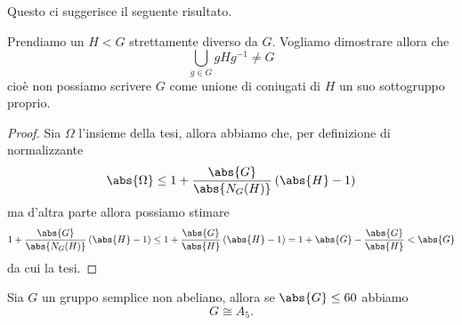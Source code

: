 \documentclass[11pt]{scrartcl}
\begin{document}
	Questo ci suggerisce il seguente risultato.
	\begin{proposition}
		Prendiamo un $H<G$ strettamente diverso da $G$. Vogliamo dimostrare allora che
		$$\bigcup_{g\in G}gHg^{-1}\ne G$$
		cioè non possiamo scrivere $G$ come unione di coniugati di $H$ un suo sottogruppo proprio.
	\end{proposition}
	\begin{proof}
		Sia $\Omega$ l'insieme della tesi, allora abbiamo che, per definizione di normalizzante
		$$\abs{\Omega}\le 1+\frac{\abs{G}}{\abs{N_G(H)}}\left(\abs{H}-1\right)$$
		ma d'altra parte allora possiamo stimare
		$$1+\frac{\abs{G}}{\abs{N_G(H)}}\left(\abs{H}-1\right)\le 1+\frac{\abs{G}}{\abs{H}}\left(\abs{H}-1\right)=1+\abs{G}-\frac{\abs{G}}{\abs{H}}<\abs{G}$$
		da cui la tesi.
	\end{proof}
	\begin{theorem}
		Sia $G$ un gruppo semplice non abeliano, allora se $\abs{G}\le 60$ abbiamo
		$$G\cong A_5.$$
	\end{theorem}
\end{document}
